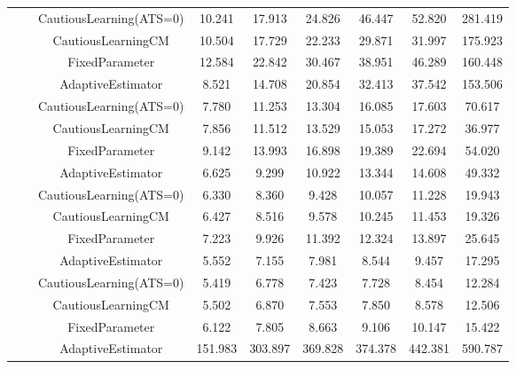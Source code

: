 \begin{table}[!h]
\begin{tabular}[t]{ccccccccc}
 &  & CautiousLearning(ATS=0) & 10.241 & 17.913 & 24.826 & 46.447 & 52.820 & 281.419\\

 &  & CautiousLearningCM & 10.504 & 17.729 & 22.233 & 29.871 & 31.997 & 175.923\\

 & \multirow[t]{-4}{*}{\centering\arraybackslash 0.75} & FixedParameter & 12.584 & 22.842 & 30.467 & 38.951 & 46.289 & 160.448\\
\cmidrule{2-9}
 &  & AdaptiveEstimator & 8.521 & 14.708 & 20.854 & 32.413 & 37.542 & 153.506\\

 &  & CautiousLearning(ATS=0) & 7.780 & 11.253 & 13.304 & 16.085 & 17.603 & 70.617\\

 &  & CautiousLearningCM & 7.856 & 11.512 & 13.529 & 15.053 & 17.272 & 36.977\\

 & \multirow[t]{-4}{*}{\centering\arraybackslash 1.00} & FixedParameter & 9.142 & 13.993 & 16.898 & 19.389 & 22.694 & 54.020\\
\cmidrule{2-9}
 &  & AdaptiveEstimator & 6.625 & 9.299 & 10.922 & 13.344 & 14.608 & 49.332\\

 &  & CautiousLearning(ATS=0) & 6.330 & 8.360 & 9.428 & 10.057 & 11.228 & 19.943\\

 &  & CautiousLearningCM & 6.427 & 8.516 & 9.578 & 10.245 & 11.453 & 19.326\\

 & \multirow[t]{-4}{*}{\centering\arraybackslash 1.25} & FixedParameter & 7.223 & 9.926 & 11.392 & 12.324 & 13.897 & 25.645\\
\cmidrule{2-9}
 &  & AdaptiveEstimator & 5.552 & 7.155 & 7.981 & 8.544 & 9.457 & 17.295\\

 &  & CautiousLearning(ATS=0) & 5.419 & 6.778 & 7.423 & 7.728 & 8.454 & 12.284\\

 &  & CautiousLearningCM & 5.502 & 6.870 & 7.553 & 7.850 & 8.578 & 12.506\\

\multirow[t]{-28}{*}{\centering\arraybackslash 1} & \multirow[t]{-4}{*}{\centering\arraybackslash 1.50} & FixedParameter & 6.122 & 7.805 & 8.663 & 9.106 & 10.147 & 15.422\\
\cmidrule{1-9}
 &  & AdaptiveEstimator & 151.983 & 303.897 & 369.828 & 374.378 & 442.381 & 590.787\\


\end{tabular}
\end{table}
